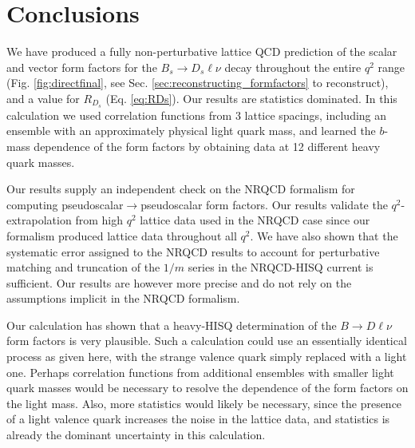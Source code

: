 
\section{Conclusions}
\label{sec:BsDs_conclusions}

We have produced a fully non-perturbative lattice QCD prediction of the scalar and vector form factors for the $B_s\to D_s \ell\nu$ decay throughout the entire $q^2$ range (Fig. \ref{fig:directfinal}, see Sec. \ref{sec:reconstructing_formfactors} to reconstruct), and a value for $R_{D_s}$ (Eq. \eqref{eq:RDs}). Our results are statistics dominated. In this calculation we used correlation functions from 3 lattice spacings, including an ensemble with an approximately physical light quark mass, and learned the $b$-mass dependence of the form factors by obtaining data at 12 different heavy quark masses.

Our results supply an independent check on the NRQCD formalism for computing pseudoscalar$\to$pseudoscalar form factors. Our results validate the $q^2$-extrapolation from high $q^2$ lattice data used in the NRQCD case since our formalism produced lattice data throughout all $q^2$. We have also shown that the systematic error assigned to the NRQCD results to account for perturbative matching and truncation of the $1/m$ series in the NRQCD-HISQ current is sufficient. Our results are however more precise and do not rely on the assumptions implicit in the NRQCD formalism.

Our calculation has shown that a heavy-HISQ determination of the $B\to D\ell\nu$ form factors is very plausible. Such a calculation could use an essentially identical process as given here, with the strange valence quark simply replaced with a light one. Perhaps correlation functions from additional ensembles with smaller light quark masses would be necessary to resolve the dependence of the form factors on the light mass. Also, more statistics would likely be necessary, since the presence of a light valence quark increases the noise in the lattice data, and statistics is already the dominant uncertainty in this calculation.

